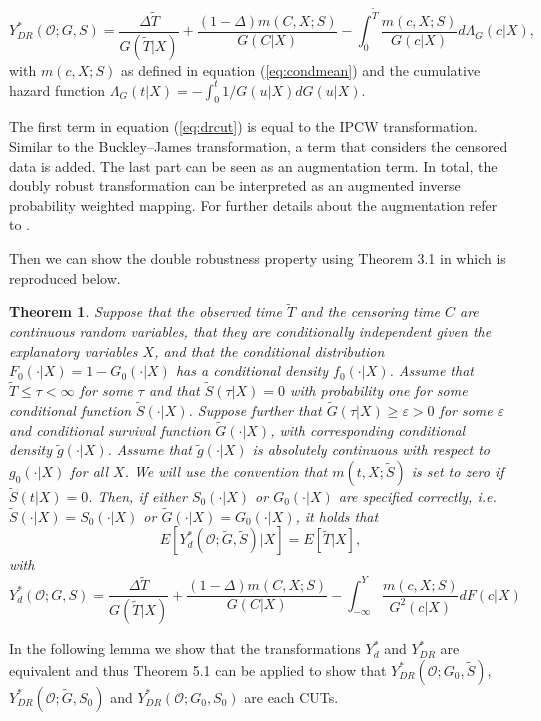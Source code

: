 \documentclass[12pt, a4paper]{scrartcl}
\theoremstyle{definition}
\theoremstyle{plain}
\newtheorem{Theorem}{Theorem}[section]
\numberwithin{equation}{section}
\numberwithin{figure}{section}
\numberwithin{table}{section}
\begin{document}
	\begin{equation}\label{eq:drcut}
	Y_{DR}^* (\mathcal{O}; G, S) = \frac{\Delta \tilde T}{G(\tilde T\vert X)} + \frac{(1-\Delta)m(C,X;S)}{G(C \vert X)} - \int_{0}^{\tilde T} \frac{m(c,X;S)}{G(c \vert X)} d\Lambda_G(c \vert X),
	\end{equation}
	with $m(c,X;S)$ as defined in equation (\ref{eq:condmean}) and the cumulative hazard function $\Lambda_G(t\vert X)=-\int_{0}^{t}1/G(u\vert X)dG(u\vert X)$.
	
	The first term in equation (\ref{eq:drcut}) is equal to the IPCW transformation.
	Similar to the Buckley--James transformation, a term that considers the censored data is added.
	The last part can be seen as an augmentation term.
	In total, the doubly robust transformation can be interpreted as an augmented inverse probability weighted mapping.
	For further details about the augmentation refer to \citet*{bookfailuretime}.
		
	Then we can show the double robustness property using Theorem 3.1 in \citet*{drcut} which is reproduced below.
	
	\begin{Theorem}\label{thm:dr}
		Suppose that the observed time $\tilde T$ and the censoring time $C$ are continuous random variables, that they are conditionally independent given the explanatory variables $X$, and that the conditional distribution $F_0(\cdot \vert X) = 1 - G_0(\cdot \vert X)$ has a conditional density $f_0(\cdot \vert X)$.
		Assume that $\tilde T \leq \tau < \infty$ for some $\tau$ and that $\tilde{S}(\tau \vert X)=0$ with probability one for some conditional function $\tilde{S}(\cdot \vert X)$.
		Suppose further that $\tilde{G}(\tau \vert X)\geq \varepsilon > 0$ for some $\varepsilon$ and conditional survival function $\tilde{G}(\cdot \vert X)$, with corresponding conditional density $\tilde{g}(\cdot\vert X)$.
		Assume that $\tilde{g}(\cdot\vert X)$ is absolutely continuous with respect to $g_0(\cdot\vert X)$ for all $X$.
		We will use the convention that $m(t,X;\tilde{S})$ is set to zero if $\tilde{S}(t \vert X)=0$.
		Then, if either $S_0(\cdot\vert X)$ or $G_0(\cdot\vert X)$ are specified correctly, i.e. $\tilde{S}(\cdot\vert X)=S_0(\cdot\vert X)$ or $\tilde{G}(\cdot\vert X)=G_0(\cdot\vert X)$, it holds that
		\begin{equation*}
		E[Y_{d}^*(\mathcal{O};\tilde{G}, \tilde{S})\vert X] = E[\tilde T \vert X],
		\end{equation*}
		with 
		\begin{equation}\label{eq:drcut2}
		Y_d^*(\mathcal{O}; G,S) = \frac{\Delta \tilde T}{G(\tilde T\vert X)}+\frac{(1-\Delta)m(C,X;S)}{G(C \vert X)}-\int_{-\infty}^{Y}\frac{m(c,X;S)}{G^2(c\vert X)}dF(c\vert X)
		\end{equation}
	\end{Theorem}
	In the following lemma we show that the transformations $Y_d^*$ and $Y_{DR}^*$ are equivalent and thus Theorem 5.1 can be applied to show that $Y_{DR}^*(\mathcal{O}; G_0, \tilde{S})$, $Y_{DR}^*(\mathcal{O}; \tilde{G}, S_0)$ and $Y_{DR}^*(\mathcal{O}; G_0, S_0)$ are each CUTs.
	
\end{document}

